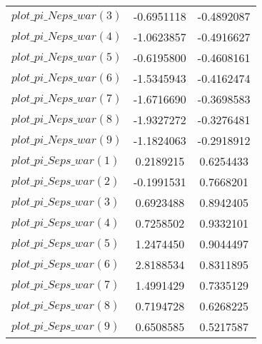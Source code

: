\begin{center}
\begin{longtable}{lcc}
$plot\_pi\_N eps\_war (3)   $	 & 	     -0.6951118	 & 	     -0.4892087 \\ 
$plot\_pi\_N eps\_war (4)   $	 & 	     -1.0623857	 & 	     -0.4916627 \\ 
$plot\_pi\_N eps\_war (5)   $	 & 	     -0.6195800	 & 	     -0.4608161 \\ 
$plot\_pi\_N eps\_war (6)   $	 & 	     -1.5345943	 & 	     -0.4162474 \\ 
$plot\_pi\_N eps\_war (7)   $	 & 	     -1.6716690	 & 	     -0.3698583 \\ 
$plot\_pi\_N eps\_war (8)   $	 & 	     -1.9327272	 & 	     -0.3276481 \\ 
$plot\_pi\_N eps\_war (9)   $	 & 	     -1.1824063	 & 	     -0.2918912 \\ 
$plot\_pi\_S eps\_war (1)   $	 & 	      0.2189215	 & 	      0.6254433 \\ 
$plot\_pi\_S eps\_war (2)   $	 & 	     -0.1991531	 & 	      0.7668201 \\ 
$plot\_pi\_S eps\_war (3)   $	 & 	      0.6923488	 & 	      0.8942405 \\ 
$plot\_pi\_S eps\_war (4)   $	 & 	      0.7258502	 & 	      0.9332101 \\ 
$plot\_pi\_S eps\_war (5)   $	 & 	      1.2474450	 & 	      0.9044497 \\ 
$plot\_pi\_S eps\_war (6)   $	 & 	      2.8188534	 & 	      0.8311895 \\ 
$plot\_pi\_S eps\_war (7)   $	 & 	      1.4991429	 & 	      0.7335129 \\ 
$plot\_pi\_S eps\_war (8)   $	 & 	      0.7194728	 & 	      0.6268225 \\ 
$plot\_pi\_S eps\_war (9)   $	 & 	      0.6508585	 & 	      0.5217587 \\ 
\end{longtable}
 \end{center}
